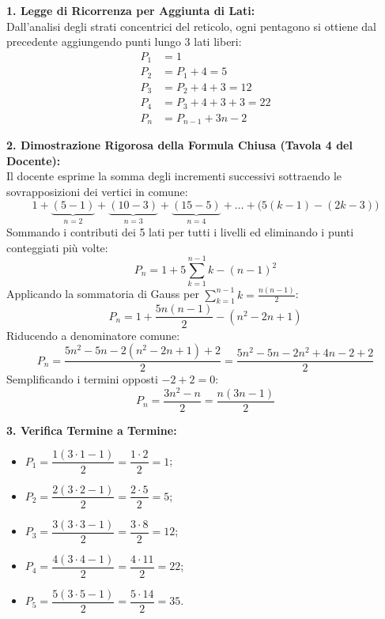 \documentclass[11pt,a4paper,oneside]{report}
\begin{document}
\begin{metodo}
\textbf{1. Legge di Ricorrenza per Aggiunta di Lati:}\\
Dall'analisi degli strati concentrici del reticolo, ogni pentagono si ottiene dal precedente aggiungendo punti lungo 3 lati liberi:
\begin{align*}
P_1 &= 1 \\
P_2 &= P_1 + 4 = 5 \\
P_3 &= P_2 + 4 + 3 = 12 \\
P_4 &= P_3 + 4 + 3 + 3 = 22 \\
P_n &= P_{n-1} + 3n - 2
\end{align*}

\textbf{2. Dimostrazione Rigorosa della Formula Chiusa (Tavola 4 del Docente):}\\
Il docente esprime la somma degli incrementi successivi sottraendo le sovrapposizioni dei vertici in comune:
\[
1 + \underbrace{(5 - 1)}_{n=2} + \underbrace{(10 - 3)}_{n=3} + \underbrace{(15 - 5)}_{n=4} + \dots + \Big( 5(k-1) - (2k - 3) \Big)
\]
Sommando i contributi dei 5 lati per tutti i livelli ed eliminando i punti conteggiati pi\`u volte:
\[
P_n = 1 + 5 \sum_{k=1}^{n-1} k - (n - 1)^2
\]
Applicando la sommatoria di Gauss per $\sum_{k=1}^{n-1} k = \frac{n(n-1)}{2}$:
\[
P_n = 1 + \frac{5n(n-1)}{2} - (n^2 - 2n + 1)
\]
Riducendo a denominatore comune:
\[
P_n = \frac{5n^2 - 5n - 2(n^2 - 2n + 1) + 2}{2} = \frac{5n^2 - 5n - 2n^2 + 4n - 2 + 2}{2}
\]
Semplificando i termini opposti $-2 + 2 = 0$:
\[
P_n = \frac{3n^2 - n}{2} = \frac{n(3n - 1)}{2}
\]

\textbf{3. Verifica Termine a Termine:}
\begin{itemize}[leftmargin=2em]
  \item $P_1 = \dfrac{1(3 \cdot 1 - 1)}{2} = \dfrac{1 \cdot 2}{2} = 1$;
  \item $P_2 = \dfrac{2(3 \cdot 2 - 1)}{2} = \dfrac{2 \cdot 5}{2} = 5$;
  \item $P_3 = \dfrac{3(3 \cdot 3 - 1)}{2} = \dfrac{3 \cdot 8}{2} = 12$;
  \item $P_4 = \dfrac{4(3 \cdot 4 - 1)}{2} = \dfrac{4 \cdot 11}{2} = 22$;
  \item $P_5 = \dfrac{5(3 \cdot 5 - 1)}{2} = \dfrac{5 \cdot 14}{2} = 35$.
\end{itemize}
\end{metodo}
\end{document}
